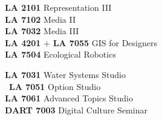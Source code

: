 \documentclass[10pt]{developercv} %
\begin{document}

\begin{minipage}[t]{0.50\textwidth} 
\textbf{LA 2101} \hspace{0.5em} Representation III \\
\textbf{LA 7102} \hspace{0.5em} Media II \\
\textbf{LA 7032} \hspace{0.5em} Media III \\
\textbf{LA 4201} + \textbf{LA 7055} \hspace{0.5em} GIS for Designers \\
\textbf{LA 7504} \hspace{0.5em} Ecological Robotics \\
\end{minipage}
\begin{minipage}[t]{0.50\textwidth} 
\textbf{LA 7031} \hspace{0.5em} Water Systems Studio \\\
\textbf{LA 7051} \hspace{0.5em} Option Studio \\
\textbf{LA 7061} \hspace{0.5em} Advanced Topics Studio \\
\textbf{DART 7003} \hspace{0.5em} Digital Culture Seminar \\
\end{minipage}




\nocite{*}
\setlength\bibitemsep{0.75em}

\printbibliography[title={\cvsect{Books}},type=book, heading=subbibliography]

\printbibliography[title={\cvsect{Papers}},keyword=peer_reviewed, heading=subbibliography]

\printbibliography[title={\cvsect{Chapters}},type=incollection, heading=subbibliography]

\printbibliography[title={\cvsect{Select presentations}},type=unpublished, heading=subbibliography]
\end{document}
